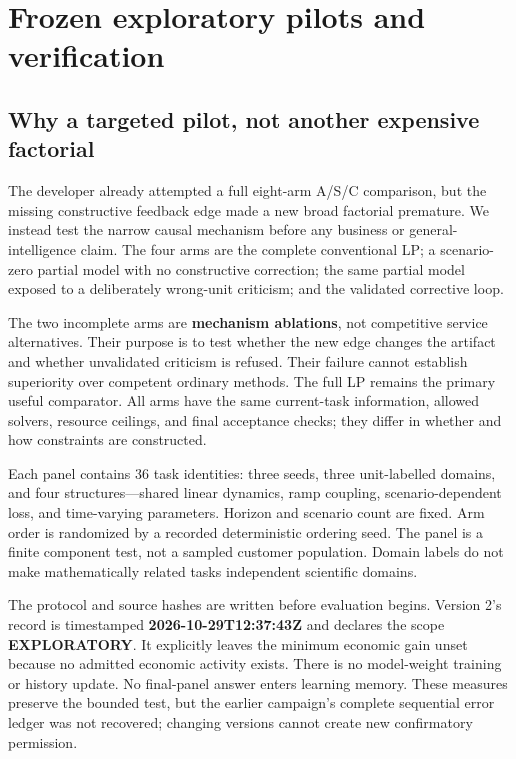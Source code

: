 \section{Frozen exploratory pilots and verification}\label{methods}

\subsection{Why a targeted pilot, not another expensive
factorial}\label{why-a-targeted-pilot-not-another-expensive-factorial}

The developer already attempted a full eight-arm A/S/C comparison, but
the missing constructive feedback edge made a new broad factorial
premature. We instead test the narrow causal mechanism before any
business or general-intelligence claim. The four arms are the complete
conventional LP; a scenario-zero partial model with no constructive
correction; the same partial model exposed to a deliberately wrong-unit
criticism; and the validated corrective loop.

The two incomplete arms are \textbf{mechanism ablations}, not
competitive service alternatives. Their purpose is to test whether the
new edge changes the artifact and whether unvalidated criticism is
refused. Their failure cannot establish superiority over competent
ordinary methods. The full LP remains the primary useful comparator. All
arms have the same current-task information, allowed solvers, resource
ceilings, and final acceptance checks; they differ in whether and how
constraints are constructed.

Each panel contains 36 task identities: three seeds, three unit-labelled
domains, and four structures---shared linear dynamics, ramp coupling,
scenario-dependent loss, and time-varying parameters. Horizon and
scenario count are fixed. Arm order is randomized by a recorded
deterministic ordering seed. The panel is a finite component test, not a
sampled customer population. Domain labels do not make mathematically
related tasks independent scientific domains.

The protocol and source hashes are written before evaluation begins.
Version 2's record is timestamped \textbf{2026-10-29T12:37:43Z} and
declares the scope \textbf{EXPLORATORY}. It explicitly leaves the
minimum economic gain unset because no admitted economic activity
exists. There is no model-weight training or history update. No
final-panel answer enters learning memory. These measures preserve the
bounded test, but the earlier campaign's complete sequential error
ledger was not recovered; changing versions cannot create new
confirmatory permission.

